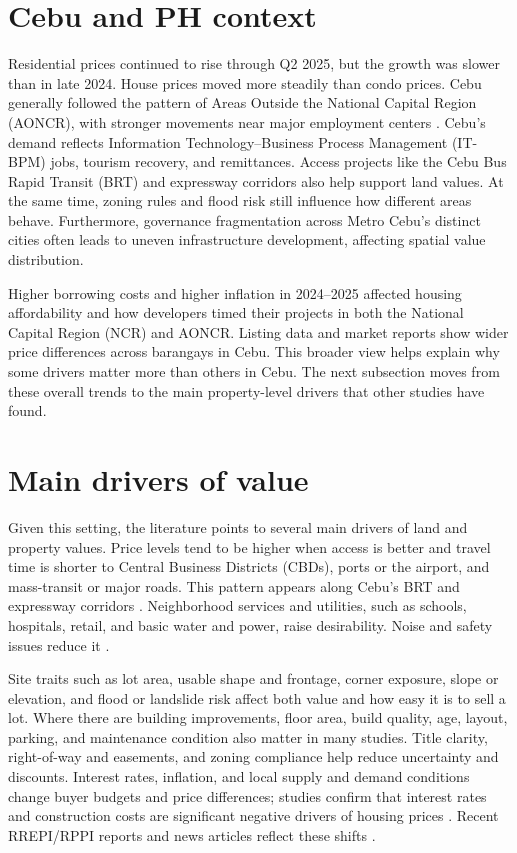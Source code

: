 \section{Cebu and PH context}

Residential prices continued to rise through Q2 2025, but the growth was slower than in late 2024. House prices moved more steadily than condo prices. Cebu generally followed the pattern of Areas Outside the National Capital Region (AONCR), with stronger movements near major employment centers \parencite{bsp2025}. Cebu’s demand reflects Information Technology–Business Process Management (IT-BPM) jobs, tourism recovery, and remittances. Access projects like the Cebu Bus Rapid Transit (BRT) and expressway corridors also help support land values. At the same time, zoning rules and flood risk still influence how different areas behave. Furthermore, governance fragmentation across Metro Cebu’s distinct cities often leads to uneven infrastructure development, affecting spatial value distribution.

Higher borrowing costs and higher inflation in 2024–2025 affected housing affordability and how developers timed their projects in both the National Capital Region (NCR) and AONCR. Listing data and market reports show wider price differences across barangays in Cebu. This broader view helps explain why some drivers matter more than others in Cebu. The next subsection moves from these overall trends to the main property-level drivers that other studies have found.

\section{Main drivers of value}

Given this setting, the literature points to several main drivers of land and property values. Price levels tend to be higher when access is better and travel time is shorter to Central Business Districts (CBDs), ports or the airport, and mass-transit or major roads. This pattern appears along Cebu’s BRT and expressway corridors \parencite{agosto2017}. Neighborhood services and utilities, such as schools, hospitals, retail, and basic water and power, raise desirability. Noise and safety issues reduce it \parencite{agosto2017}.

Site traits such as lot area, usable shape and frontage, corner exposure, slope or elevation, and flood or landslide risk affect both value and how easy it is to sell a lot. Where there are building improvements, floor area, build quality, age, layout, parking, and maintenance condition also matter in many studies. Title clarity, right-of-way and easements, and zoning compliance help reduce uncertainty and discounts. Interest rates, inflation, and local supply and demand conditions change buyer budgets and price differences; studies confirm that interest rates and construction costs are significant negative drivers of housing prices \parencite{udomsap2020}. Recent RREPI/RPPI reports and news articles reflect these shifts \parencite{bsp2025}.


